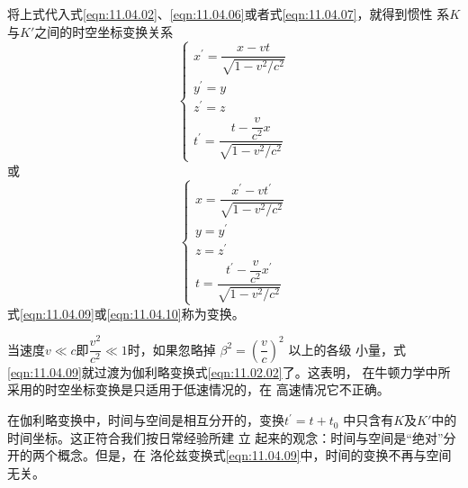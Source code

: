 将上式代入式\eqref{eqn:11.04.02}、\eqref{eqn:11.04.06}或者式\eqref{eqn:11.04.07}，就得到惯性
系$ K $与$ K' $之间的时空坐标变换关系
\begin{equation}\label{eqn:11.04.09}
  \begin{cases}
    x ^ { \prime } = \dfrac { x - v t } { \sqrt { 1 - v ^ 2 / c ^ 2 } } \\
    y ^ { \prime } = y                                                  \\
    z ^ { \prime } = z                                                  \\
    t ^ { \prime } = \dfrac { t - \dfrac v { c ^ 2 } x } { \sqrt { 1 - v ^ 2 / c ^ 2 } }
  \end{cases}
\end{equation}
或
\begin{equation}\label{eqn:11.04.10}
  \begin{cases}
    x = \dfrac { x ^ { \prime } - v t ^ { \prime } } { \sqrt { 1 - v ^ 2 / c ^ 2 } } \\
    y = y ^ { \prime }                                                               \\
    z = z ^ { \prime }                                                               \\
    t = \dfrac { t ^ { \prime } - \dfrac v { c ^ 2 } x ^ { \prime } } { \sqrt { 1 - v ^ 2 / c ^ 2 } }
  \end{cases}
\end{equation}
式\eqref{eqn:11.04.09}或\eqref{eqn:11.04.10}称为变换。

当速度$ v \ll c $即$ \dfrac { v ^ { 2 } } { c ^ { 2 } } \ll 1 $时，如果忽略掉
$ \beta ^ { 2 } = \left( \dfrac { v } { c } \right) ^ { 2 } $
以上的各级
小量，式\eqref{eqn:11.04.09}就过渡为伽利略变换式\eqref{eqn:11.02.02}了。这表明，
在牛顿力学中所采用的时空坐标变换是只适用于低速情况的，在
高速情况它不正确。

在伽利略变换中，时间与空间是相互分开的，变换$ t ^ { \prime } = t + t _ { 0 } $
中只含有$ K $及$ K ' $中的时间坐标。这正符合我们按日常经验所建
立
起来的观念：时间与空间是“绝对”分开的两个概念。但是，在
洛伦兹变换\lhbrak 式\eqref{eqn:11.04.09}\rhbrak 中，时间的变换不再与空间无关。
